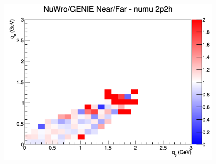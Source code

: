 \begin{figure}[h]
\endminipage
{}
\includegraphics[width=\linewidth]{eff_q0_q3/LAr/ratios/2p2h_NuWro_GENIE_numu_NF_q3_q0.png}
\endminipage
\newline
\end{figure}
\clearpage
